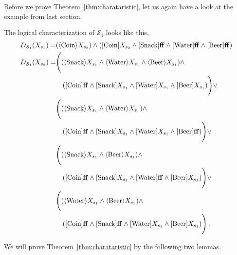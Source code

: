 Before we prove Theorem~\ref{thm:charataristic}, let us again have a look at the example from last section.
\begin{example}
 The logical characterization of $\mathcal{S}_1$ looks like this,
	\begin{align*}
		D_{\mathcal{S}_1}(X_{s_1}) =& ( \langle \text{Coin} \rangle X_{s_2} ) \wedge ( [\text{Coin}] X_{s_2} \wedge [\text{Snack}] \mathbf{ff} \wedge [\text{Water}] \mathbf{ff} \wedge [\text{Beer}] \mathbf{ff} ) \\
	    D_{\mathcal{S}_1}(X_{s_2}) =
	    & \Bigg{(} ( \langle \text{Snack} \rangle X_{s_1} \wedge \langle \text{Water} \rangle X_{s_1} \wedge \langle \text{Beer} \rangle X_{s_1}  ) \wedge \\ &\quad( [\text{Coin}] \mathbf{ff} \wedge [\text{Snack}] X_{s_1} \wedge [\text{Water}] X_{s_1} \wedge [\text{Beer}] X_{s_1}  )
	\Bigg{)} \vee\\
		& \Bigg{(} ( \langle \text{Snack} \rangle X_{s_1} \wedge \langle \text{Water} \rangle X_{s_1}  ) \wedge \\ &\quad( [\text{Coin}] \mathbf{ff} \wedge [\text{Snack}] X_{s_1} \wedge [\text{Water}] X_{s_1} \wedge [\text{Beer}] \mathbf{ff}  )
	\Bigg{)} \vee\\
		& \Bigg{(}( \langle \text{Snack} \rangle X_{s_1} \wedge \langle \text{Beer} \rangle X_{s_1}  ) \wedge\\ &\quad  ( [\text{Coin}] \mathbf{ff} \wedge [\text{Snack}] X_{s_1} \wedge [\text{Water}] \mathbf{ff} \wedge [\text{Beer}] X_{s_1}  )
	\Bigg{)} \vee\\
		 & \Bigg{(}( \langle \text{Water} \rangle X_{s_1} \wedge \langle \text{Beer} \rangle X_{s_1}  ) \wedge \\ &\quad( [\text{Coin}] \mathbf{ff} \wedge [\text{Snack}] \mathbf{ff} \wedge [\text{Water}] X_{s_1} \wedge [\text{Beer}] X_{s_1}  )
		\Bigg{)}\; .
	\end{align*}
\end{example}


We will prove Theorem~\ref{thm:charataristic} by the following two lemmas.


